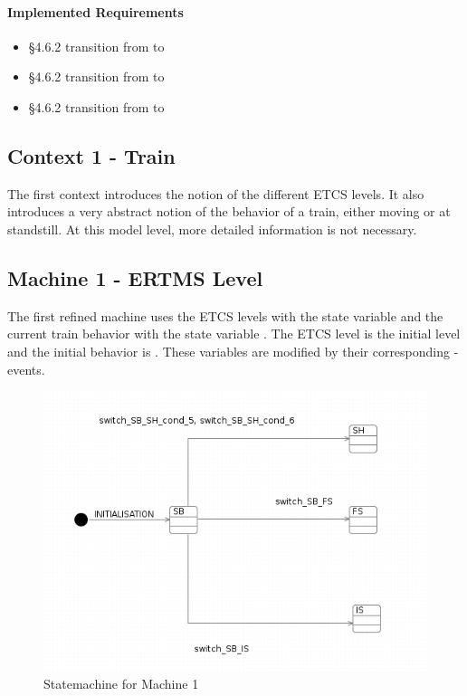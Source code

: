 \documentclass{template/openetcs_article}
\begin{document}
\paragraph{Implemented Requirements}
\label{sec:impl-requ}

\begin{itemize}
\item §4.6.2 transition from  to 
\item §4.6.2 transition from  to 
\item §4.6.2 transition from  to 
\end{itemize}



\subsection{Context 1 - Train}
\label{sec:context-1-train}

The first context introduces the notion of the different ETCS levels. It also
introduces a very abstract notion of the behavior of a train, either moving or
at standstill. At this model level, more detailed information is not necessary.



\subsection{Machine 1 - ERTMS Level}
\label{sec:machine-1-ertms}

The first refined machine uses the ETCS levels with the state variable
 and the current train behavior with the state variable
. The ETCS level  is the initial level and
the initial behavior is . These variables are modified by
their corresponding -events.

\begin{figure}[ht]
  \centering
  \includegraphics[width=.75\textwidth]{statechart2}
  \caption{Statemachine for Machine 1}
  \label{fig:statemachine-m1}
\end{figure}
\end{document}
